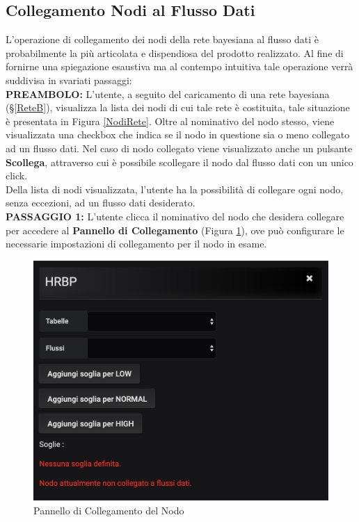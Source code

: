 \subsection{Collegamento Nodi al Flusso Dati}\label{Collegamento}

L'operazione di collegamento dei nodi della rete bayesiana al flusso dati è probabilmente la più articolata e dispendiosa del prodotto realizzato. Al fine di fornirne una spiegazione esaustiva ma al contempo intuitiva tale operazione verrà suddivisa in svariati passaggi:
~\\

\textbf{PREAMBOLO:} L'utente, a seguito del caricamento di una rete bayesiana (§\ref{ReteB}), visualizza la lista dei nodi di cui tale rete è costituita, tale situazione è presentata in Figura \ref{NodiRete}. Oltre al nominativo del nodo stesso, viene visualizzata una checkbox che indica se il nodo in questione sia o meno collegato ad un flusso dati. Nel caso di nodo collegato viene visualizzato anche un pulsante \textbf{Scollega}, attraverso cui è possibile scollegare il nodo dal flusso dati con un unico click.\\
Della lista di nodi visualizzata, l'utente ha la possibilità di collegare ogni nodo, senza eccezioni, ad un flusso dati desiderato.
~\\

\textbf{PASSAGGIO 1:} L'utente clicca il nominativo del nodo che desidera collegare per accedere al \textbf{Pannello di Collegamento} (Figura \ref{PannelloNodo}), ove può configurare le necessarie impostazioni di collegamento per il nodo in esame.

\begin{figure}[H]
	\begin{center}
		\includegraphics[scale=0.6]{./images/PannelloNodo.png}
		 \caption{Pannello di Collegamento del Nodo}	
		 \label{PannelloNodo}
	\end{center}
\end{figure}

